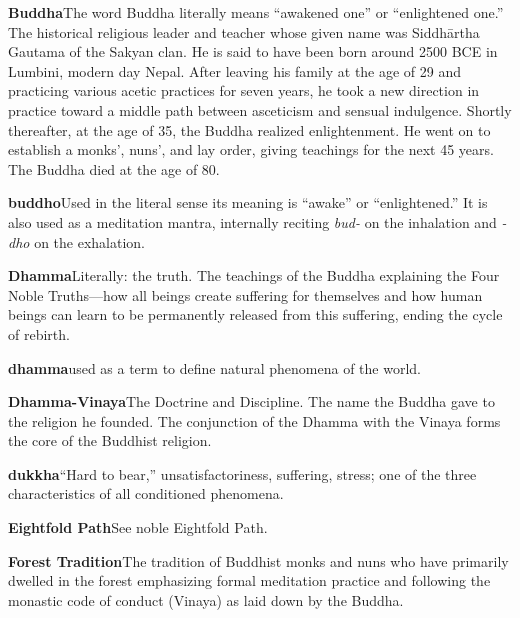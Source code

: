 {\textbf{Buddha}\hspace{\glosskip}The word Buddha literally means ``awakened one'' or 
``enlightened one.'' The historical religious leader and teacher whose 
given name was Siddhārtha Gautama of the Sakyan clan. He is said to 
have been born around 2500 BCE in Lumbini, modern day Nepal. After 
leaving his family at the age of 29 and practicing various acetic 
practices for seven years, he took a new direction in practice toward a 
middle path between asceticism and sensual indulgence. Shortly 
thereafter, at the age of 35, the Buddha realized enlightenment. He 
went on to establish a monks', nuns', and lay order, giving teachings 
for the next 45 years. The Buddha died at the age of 80.

\textbf{buddho}\hspace{\glosskip}Used in the literal sense its meaning is ``awake'' or 
``enlightened.'' It is also used as a meditation mantra, internally 
reciting \emph{bud-} on the inhalation and \emph{-dho} on the 
exhalation.

\textbf{Dhamma}\hspace{\glosskip}Literally: the truth. The teachings of the Buddha 
explaining the Four Noble Truths---how all beings create suffering for 
themselves and how human beings can learn to be permanently released 
from this suffering, ending the cycle of rebirth.

\textbf{dhamma}\hspace{\glosskip}used as a term to define natural phenomena of the world.

\textbf{Dhamma-Vinaya}\hspace{\glosskip}The Doctrine and Discipline. The name the Buddha 
gave to the religion he founded. The conjunction of the Dhamma with the 
Vinaya forms the core of the Buddhist religion.

\textbf{dukkha}\hspace{\glosskip}``Hard to bear,'' unsatisfactoriness, suffering, 
stress; one of the three characteristics of all conditioned phenomena.

\textbf{Eightfold Path}\hspace{\glosskip}See noble Eightfold Path.

\textbf{Forest Tradition}\hspace{\glosskip}The tradition of Buddhist monks and nuns who 
have primarily dwelled in the forest emphasizing formal meditation 
practice and following the monastic code of conduct (Vinaya) as laid 
down by the Buddha.

}
